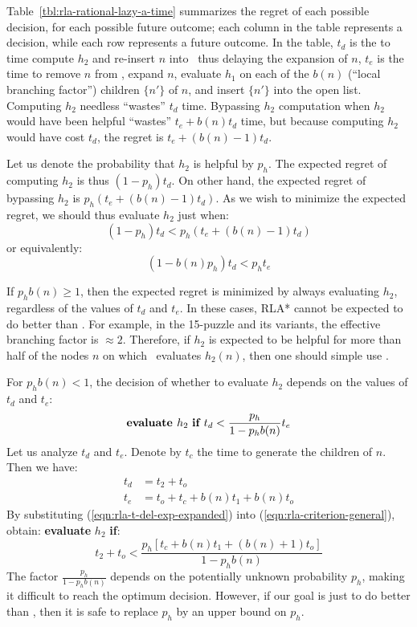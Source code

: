Table~\ref{tbl:rla-rational-lazy-a-time}
summarizes the regret of each possible decision, for each possible future
outcome; each column in the table represents a decision, while each row
represents a future outcome.
In the table, $t_d$ is the to time compute $h_2$ and re-insert $n$ into
\OPEN~thus delaying the expansion of $n$, $t_e$ is the time to remove $n$ from \OPEN,
expand $n$, evaluate $h_1$ on each of the $b(n)$ (``local branching factor'')
children $\{n'\}$ of $n$, and insert $\{n'\}$ into the open list.
Computing $h_2$ needless ``wastes'' $t_d$ time.
Bypassing $h_2$ computation when $h_2$ would have been helpful ``wastes''
$t_e+b(n)t_d$ time, but because computing $h_2$ would have cost $t_d$, the
regret is $t_e+(b(n)-1)t_d$.

Let us denote the probability that $h_2$ is helpful by
$p_h$. The expected regret of computing $h_2$ is thus $(1-p_h) t_d$.
On other hand, the expected regret of bypassing $h_2$ is $p_h(
t_e+(b(n)-1)t_d)$. As we wish to minimize the expected regret, we should thus evaluate $h_2$ just when:
\begin{equation}
(1-p_h) t_d < p_h (t_e+(b(n)-1)t_d)
\end{equation}
or equivalently:
\begin{equation}
(1-b(n) p_h) t_d < p_h t_e
\end{equation}

If $p_h b(n) \ge 1$, then the expected regret is minimized by always
evaluating $h_2$, regardless of the values of $t_d$ and $t_e$.
In these cases, RLA* cannot be expected to do better than \lazyastar.
For example, in the 15-puzzle and its variants, the
effective branching factor is $\approx 2$. Therefore, if $h_2$ is expected to be helpful for more than half of the nodes $n$
on which \lazyastar~evaluates $h_2(n)$, then one should simple use \lazyastar.

For $p_h b(n) < 1$,  the decision of whether to evaluate $h_2$
depends on the values of $t_d$ and $t_e$:
\begin{equation}
\mbox{\bf evaluate }h_2\mbox{ \bf if }t_d<\frac {p_h} {1-p_hb(n)} t_e
\label{eqn:rla-criterion-general}
\end{equation}
Let us analyze $t_d$ and $t_e$. Denote by
$t_c$ the time to generate the children of $n$. Then we have:
\begin{align}
t_d&=t_2+t_o\nonumber\\
t_e&=t_o + t_c+b (n) t_1 + b(n) t_o
\label{eqn:rla-t-del-exp-expanded}
\end{align}
By substituting
(\ref{eqn:rla-t-del-exp-expanded}) into (\ref{eqn:rla-criterion-general}), obtain: {\bf evaluate} $h_2$ {\bf if}:
\begin{equation}
{t_2+t_o}<\frac {p_h \left[{t_c} + b (n)t_1+(b(n)+1){t_o}\right]} {1-p_hb(n)}
\label{eqn:rla-criterion-expanded}
\end{equation}
The factor $\frac {p_h} {1-p_hb(n)}$ depends on the potentially unknown
probability $p_h$, making it difficult to reach the optimum decision.
However, if our goal is just to do better than \lazyastar, then it is safe to replace $p_h$ by an upper bound on $p_h$.

